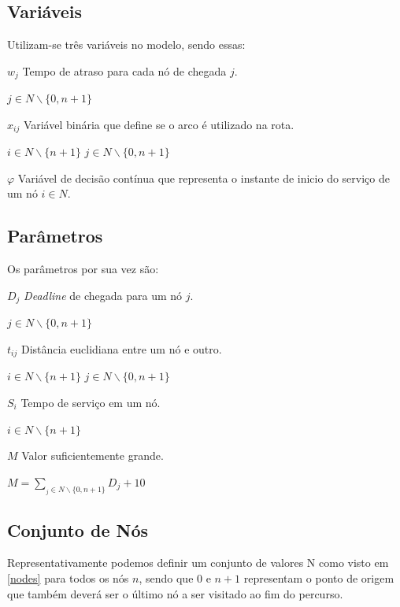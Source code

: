 \documentclass[12pt]{article}
\begin{document}
\subsection{Variáveis}

Utilizam-se três variáveis no modelo, sendo essas:

$w_j$ Tempo de atraso para cada nó de chegada $j$.

\hspace{1.27cm} $j\in N\backslash \{0,n+1\}$

$x_{ij}$ Variável binária que define se o arco é utilizado na rota.

\hspace{1.27cm} $i\in N\backslash \{n+1\}$ \hspace{1.27cm}  $j\in N\backslash \{0,n+1\}$

$\varphi$ Variável de decisão contínua que representa o instante de inicio do serviço de um nó $i\in N$.


\subsection{Parâmetros}

Os parâmetros por sua vez são:

$D_j$ {\it Deadline} de chegada para um nó $j$.

\hspace{1.27cm} $j\in N\backslash \{0,n+1\}$

$t_{ij}$ Distância euclidiana entre um nó e outro.

\hspace{1.27cm} $i\in N\backslash \{n+1\}$ \hspace{1.27cm}  $j\in N\backslash \{0,n+1\}$

$S_i$ Tempo de serviço em um nó.

\hspace{1.27cm} $i\in N\backslash \{n+1\}$

$M$ Valor suficientemente grande.

\hspace{1.27cm} $M = \sum_{_j\in N\backslash \{0,n+1\}}  D_j + 10$


\subsection{Conjunto de Nós}

Representativamente podemos definir um conjunto de valores N como visto em \eqref{nodes} para todos os nós $n$, sendo que 0 e $n+1$ representam o ponto de origem que também deverá ser o último nó a ser visitado ao fim do percurso.
\end{document}
